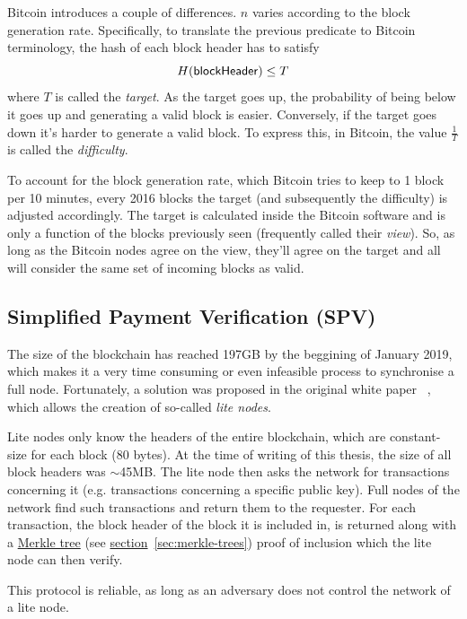 Bitcoin introduces a couple of differences. $n$ varies according to the block generation rate. Specifically, to translate the previous predicate to Bitcoin terminology, the hash of each block header has to satisfy
\begin{equation} \label{eq:PoW}
  H({\sf blockHeader}) \le T
\end{equation}
where $T$ is called the \emph{target}. As the target goes up, the probability of being below it goes up and generating a valid block is easier. Conversely, if the target goes down it's harder to generate a valid block. To express this, in Bitcoin, the value $\frac{1}{T}$ is called the \emph{difficulty}.

To account for the block generation rate, which Bitcoin tries to keep to 1 block per 10 minutes, every 2016 blocks the target (and subsequently the difficulty) is adjusted accordingly. The target is calculated inside the Bitcoin software and is only a function of the blocks previously seen (frequently called their \emph{view}). So, as long as the Bitcoin nodes agree on the view, they'll agree on the target and all will consider the same set of incoming blocks as valid.

\subsection{Simplified Payment Verification (SPV)}
The size of the blockchain has reached 197GB by the beggining of January 2019, which makes it a very time consuming or even infeasible process to synchronise a full node. Fortunately, a solution was proposed in the original white paper ~\cite{Nakamoto_bitcoin:a}, which allows the creation of so-called \emph{lite nodes}.

Lite nodes only know the headers of the entire blockchain, which are constant-size for each block (80 bytes). At the time of writing of this thesis, the size of all block headers was $\sim$45MB. The lite node then asks the network for transactions concerning it (e.g. transactions concerning a specific public key). Full nodes of the network find such transactions and return them to the requester. For each transaction, the block header of the block it is included in, is returned along with a \hyperref[sec:merkle-trees]{Merkle tree} (see \hyperref[sec:merkle-trees]{section}~\ref{sec:merkle-trees}) proof of inclusion which the lite node can then verify.

This protocol is reliable, as long as an adversary does not control the network of a lite node.

